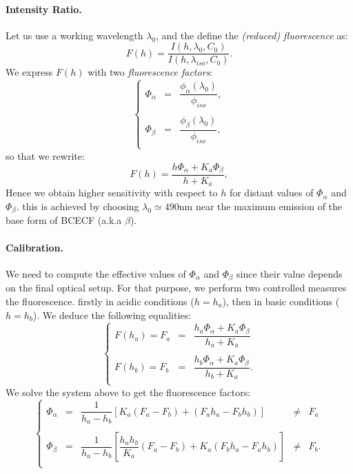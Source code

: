 \documentclass[12pt]{article}
\begin{document}
\paragraph{Intensity Ratio.}
\noindent Let us use a working wavelength $\lambda_0$, and the define the \textit{(reduced) fluorescence} as:
\begin{equation}
	F(h) = \dfrac{I(h,\lambda_0,C_0)}{I(h,\lambda_{iso},C_0)}.
\end{equation}
We express $F(h)$ with   two   \textit{fluorescence factors}:
\begin{equation}
\left\lbrace
\begin{array}{rcl}
	\Phi_\alpha & = &  \dfrac{\phi_\alpha(\lambda_0)}{\phi_{iso}},\\
	\\
	\Phi_\beta  & = &  \dfrac{\phi_\beta(\lambda_0)}{\phi_{iso}},\\
\end{array}
\right.
\end{equation}
so that we rewrite:
\begin{equation}
\label{eq:F}
	F(h) = \dfrac{h\Phi_\alpha + K_a\Phi_\beta}{h+K_a},
\end{equation}
Hence we obtain higher sensitivity with respect to $h$ for distant values of $\Phi_\alpha$ and $\Phi_\beta$.
this is achieved by choosing $\lambda_0\simeq 490 \mathrm{nm}$ near the maximum emission
of the base form of BCECF (a.k.a $\beta$).

\paragraph{Calibration.}
\noindent We need to compute the effective values of $\Phi_\alpha$ and $\Phi_\beta$ since their value
depends on the final optical setup. For that purpose, we perform two controlled measures the fluorescence.
firstly in acidic conditions ($h=h_a$), then in basic conditions ($h=h_b$).
We deduce the following equalities: 
\begin{equation}
\left\lbrace
	\begin{array}{rcl}
	F(h_a) = F_a & = & \dfrac{h_a\Phi_\alpha + K_a\Phi_\beta}{h_a+K_a}\\
	\\
	F(h_b) = F_b & = & \dfrac{h_b\Phi_\alpha + K_a\Phi_\beta}{h_b+K_a}.\\
	\end{array}
\right.
\end{equation}
We solve the system above to get the fluorescence factors:
\begin{equation}
\left\lbrace
\begin{array}{rclcl}
	\Phi_\alpha & = & \dfrac{1}{h_a-h_b}\left[ K_a(F_a-F_b) + (F_ah_a-F_bh_b)\right] & \not= & F_a \\
	\\
	\Phi_\beta & = & \dfrac{1}{h_a-h_b}\left[ \dfrac{h_ah_b}{K_a} (F_a-F_b) + K_a(F_bh_a-F_ah_b)\right]  & \not= & F_b.\\
\end{array}
\right.
\end{equation}
\end{document}
